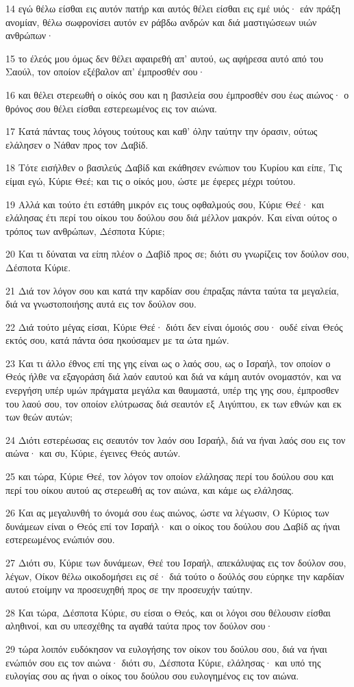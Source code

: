 \par 14 εγώ θέλω είσθαι εις αυτόν πατήρ και αυτός θέλει είσθαι εις εμέ υιός· εάν πράξη ανομίαν, θέλω σωφρονίσει αυτόν εν ράβδω ανδρών και διά μαστιγώσεων υιών ανθρώπων·
\par 15 το έλεός μου όμως δεν θέλει αφαιρεθή απ' αυτού, ως αφήρεσα αυτό από του Σαούλ, τον οποίον εξέβαλον απ' έμπροσθέν σου·
\par 16 και θέλει στερεωθή ο οίκός σου και η βασιλεία σου έμπροσθέν σου έως αιώνος· ο θρόνος σου θέλει είσθαι εστερεωμένος εις τον αιώνα.
\par 17 Κατά πάντας τους λόγους τούτους και καθ' όλην ταύτην την όρασιν, ούτως ελάλησεν ο Νάθαν προς τον Δαβίδ.
\par 18 Τότε εισήλθεν ο βασιλεύς Δαβίδ και εκάθησεν ενώπιον του Κυρίου και είπε, Τις είμαι εγώ, Κύριε Θεέ; και τις ο οίκός μου, ώστε με έφερες μέχρι τούτου.
\par 19 Αλλά και τούτο έτι εστάθη μικρόν εις τους οφθαλμούς σου, Κύριε Θεέ· και ελάλησας έτι περί του οίκου του δούλου σου διά μέλλον μακρόν. Και είναι ούτος ο τρόπος των ανθρώπων, Δέσποτα Κύριε;
\par 20 Και τι δύναται να είπη πλέον ο Δαβίδ προς σε; διότι συ γνωρίζεις τον δούλον σου, Δέσποτα Κύριε.
\par 21 Διά τον λόγον σου και κατά την καρδίαν σου έπραξας πάντα ταύτα τα μεγαλεία, διά να γνωστοποιήσης αυτά εις τον δούλον σου.
\par 22 Διά τούτο μέγας είσαι, Κύριε Θεέ· διότι δεν είναι όμοιός σου· ουδέ είναι Θεός εκτός σου, κατά πάντα όσα ηκούσαμεν με τα ώτα ημών.
\par 23 Και τι άλλο έθνος επί της γης είναι ως ο λαός σου, ως ο Ισραήλ, τον οποίον ο Θεός ήλθε να εξαγοράση διά λαόν εαυτού και διά να κάμη αυτόν ονομαστόν, και να ενεργήση υπέρ υμών πράγματα μεγάλα και θαυμαστά, υπέρ της γης σου, έμπροσθεν του λαού σου, τον οποίον ελύτρωσας διά σεαυτόν εξ Αιγύπτου, εκ των εθνών και εκ των θεών αυτών;
\par 24 Διότι εστερέωσας εις σεαυτόν τον λαόν σου Ισραήλ, διά να ήναι λαός σου εις τον αιώνα· και συ, Κύριε, έγεινες Θεός αυτών.
\par 25 και τώρα, Κύριε Θεέ, τον λόγον τον οποίον ελάλησας περί του δούλου σου και περί του οίκου αυτού ας στερεωθή ας τον αιώνα, και κάμε ως ελάλησας.
\par 26 Και ας μεγαλυνθή το όνομά σου έως αιώνος, ώστε να λέγωσιν, Ο Κύριος των δυνάμεων είναι ο Θεός επί τον Ισραήλ· και ο οίκος του δούλου σου Δαβίδ ας ήναι εστερεωμένος ενώπιόν σου.
\par 27 Διότι συ, Κύριε των δυνάμεων, Θεέ του Ισραήλ, απεκάλυψας εις τον δούλον σου, λέγων, Οίκον θέλω οικοδομήσει εις σέ· διά τούτο ο δούλός σου εύρηκε την καρδίαν αυτού ετοίμην να προσευχηθή προς σε την προσευχήν ταύτην.
\par 28 Και τώρα, Δέσποτα Κύριε, συ είσαι ο Θεός, και οι λόγοι σου θέλουσιν είσθαι αληθινοί, και συ υπεσχέθης τα αγαθά ταύτα προς τον δούλον σου·
\par 29 τώρα λοιπόν ευδόκησον να ευλογήσης τον οίκον του δούλου σου, διά να ήναι ενώπιόν σου εις τον αιώνα· διότι συ, Δέσποτα Κύριε, ελάλησας· και υπό της ευλογίας σου ας ήναι ο οίκος του δούλου σου ευλογημένος εις τον αιώνα.

